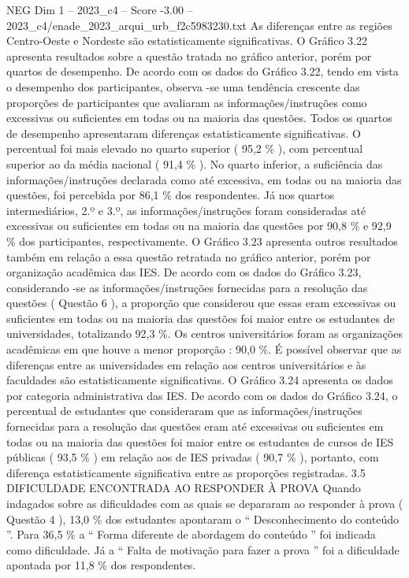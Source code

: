 \begin{textsample}{NEG Dim 1 – 2023\_c4 – Score -3.00 – 2023\_c4/enade\_2023\_arqui\_urb\_f2c5983230.txt}
As diferenças entre as regiões Centro-Oeste e Nordeste são estatisticamente significativas.
O Gráfico 3.22 apresenta resultados sobre a questão tratada no gráfico anterior, porém por quartos de desempenho.
De acordo com os dados do Gráfico 3.22, tendo em vista o desempenho dos participantes, observa -se uma tendência crescente das proporções de participantes que avaliaram as informações/instruções como excessivas ou suficientes em todas ou na maioria das questões.
Todos os quartos de desempenho apresentaram diferenças estatisticamente significativas.
O percentual foi mais elevado no quarto superior ( 95,2 \% ), com percentual superior ao da média nacional ( 91,4 \% ).
No quarto inferior, a suficiência das informações/instruções declarada como até excessiva, em todas ou na maioria das questões, foi percebida por 86,1 \% dos respondentes.
Já nos quartos intermediários, 2.º e 3.º, as informações/instruções foram consideradas até excessivas ou suficientes em todas ou na maioria das questões por 90,8 \% e 92,9 \% dos participantes, respectivamente.
O Gráfico 3.23 apresenta outros resultados também em relação a essa questão retratada no gráfico anterior, porém por organização acadêmica das IES.
De acordo com os dados do Gráfico 3.23, considerando -se as informações/instruções fornecidas para a resolução das questões ( Questão 6 ), a proporção que considerou que essas eram excessivas ou suficientes em todas ou na maioria das questões foi maior entre os estudantes de universidades, totalizando 92,3 \%.
Os centros universitários foram as organizações acadêmicas em que houve a menor proporção : 90,0 \%.
É possível observar que as diferenças entre as universidades em relação aos centros universitários e às faculdades são estatisticamente significativas.
O Gráfico 3.24 apresenta os dados por categoria administrativa das IES.
De acordo com os dados do Gráfico 3.24, o percentual de estudantes que consideraram que as informações/instruções fornecidas para a resolução das questões eram até excessivas ou suficientes em todas ou na maioria das questões foi maior entre os estudantes de cursos de IES públicas ( 93,5 \% ) em relação aos de IES privadas ( 90,7 \% ), portanto, com diferença estatisticamente significativa entre as proporções registradas. 3.5 DIFICULDADE ENCONTRADA AO RESPONDER À PROVA Quando indagados sobre as dificuldades com as quais se depararam ao responder à prova ( Questão 4 ), 13,0 \% dos estudantes apontaram o “ Desconhecimento do conteúdo ”.
Para 36,5 \% a “ Forma diferente de abordagem do conteúdo ” foi indicada como dificuldade.
Já a “ Falta de motivação para fazer a prova ” foi a dificuldade apontada por 11,8 \% dos respondentes.

\end{textsample}
